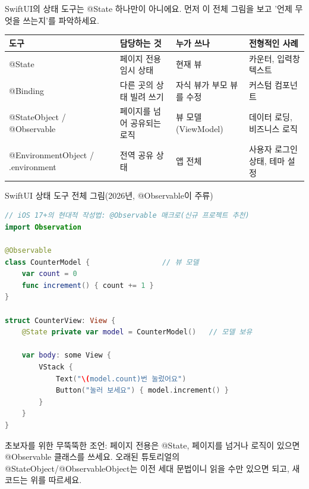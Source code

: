 


SwiftUI의 상태 도구는 @State 하나만이 아니에요. 먼저 이 전체 그림을 보고 '언제 무엇을 쓰는지'를 파악하세요.

\begin{center}
\begin{tabularx}{\linewidth}{|X|X|X|X|}
\hline
\textbf{도구} & \textbf{담당하는 것} & \textbf{누가 쓰나} & \textbf{전형적인 사례} \tabularnewline
\hline
@State & 페이지 전용 임시 상태 & 현재 뷰 & 카운터, 입력창 텍스트 \tabularnewline
@Binding & 다른 곳의 상태 빌려 쓰기 & 자식 뷰가 부모 뷰를 수정 & 커스텀 컴포넌트 \tabularnewline
@StateObject / @Observable & 페이지를 넘어 공유되는 로직 & 뷰 모델(ViewModel) & 데이터 로딩, 비즈니스 로직 \tabularnewline
@EnvironmentObject / .environment & 전역 공유 상태 & 앱 전체 & 사용자 로그인 상태, 테마 설정 \tabularnewline
\hline
\end{tabularx}
\end{center}

\begin{center}\small\color{gray}SwiftUI 상태 도구 전체 그림(2026년, @Observable이 주류)\end{center}

\begin{lstlisting}[language=Swift]
// iOS 17+의 현대적 작성법: @Observable 매크로(신규 프로젝트 추천)
import Observation

@Observable
class CounterModel {                 // 뷰 모델
    var count = 0
    func increment() { count += 1 }
}

struct CounterView: View {
    @State private var model = CounterModel()   // 모델 보유

    var body: some View {
        VStack {
            Text("\(model.count)번 눌렀어요")
            Button("눌러 보세요") { model.increment() }
        }
    }
}
\end{lstlisting}

초보자를 위한 무뚝뚝한 조언: 페이지 전용은 @State, 페이지를 넘거나 로직이 있으면 @Observable 클래스를 쓰세요. 오래된 튜토리얼의 @StateObject/@ObservableObject는 이전 세대 문법이니 읽을 수만 있으면 되고, 새 코드는 위를 따르세요.

